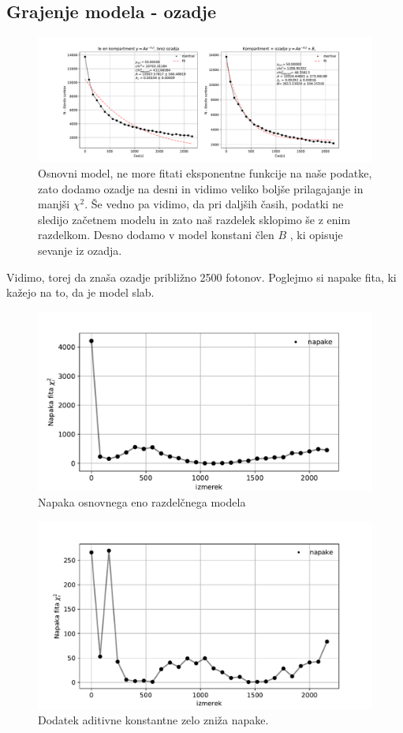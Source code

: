 \documentclass[11pt, a4paper]{article}
\begin{document}
\subsection{Grajenje modela - ozadje }
 \begin{figure}[H]
\hspace*{-4cm}     
  \includegraphics[width=24cm]{druga_en_kompartment.pdf}
 \caption{Osnovni model, ne more fitati eksponentne funkcije na naše podatke, zato dodamo ozadje na desni in vidimo veliko boljše prilagajanje in manjši $\chi^2$. Še vedno pa vidimo, da pri daljših časih, podatki ne sledijo začetnem modelu in zato naš razdelek sklopimo še z enim razdelkom. Desno dodamo v model konstani člen $B$ , ki opisuje sevanje iz ozadja.}
\end{figure}
Vidimo, torej da znaša ozadje približno 2500 fotonov. \newline
Poglejmo si napake fita, ki kažejo na to, da je model slab.
 \begin{figure}[H]
   
  \includegraphics[width=16cm]{druga_napaka_1.pdf}
 \caption{Napaka osnovnega eno razdelčnega modela}
\end{figure}
 \begin{figure}[H]
   
  \includegraphics[width=16cm]{druga_napaka_2.pdf}
 \caption{Dodatek aditivne konstantne zelo zniža napake.}
\end{figure}
\end{document}
